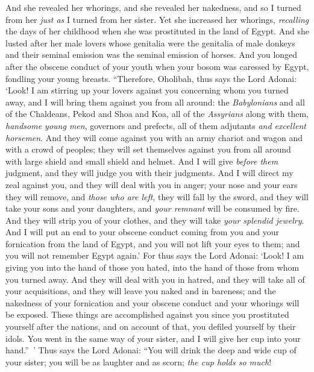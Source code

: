\begin{biblechapter}
\verse And she revealed her whorings, and she revealed her nakedness, and so I turned from her \textit{just as} I turned from her sister.
\verse Yet she increased her whorings, \textit{recalling} the days of her childhood when she was prostituted in the land of Egypt.
\verse And she lusted after her male lovers whose genitalia were the genitalia of male donkeys and their seminal emission was the seminal emission of horses.
\verse And you longed after the obscene conduct of your youth when your bosom was caressed by Egypt, fondling your young breasts.
\verse “Therefore, Oholibah, thus says the Lord Adonai: ‘Look! I am stirring up your lovers against you concerning whom you turned away, and I will bring them against you from all around:
\verse the \textit{Babylonians} and all of the Chaldeans, Pekod and Shoa and Koa, all of the \textit{Assyrians} along with them, \textit{handsome young men}, governors and prefects, all of them adjutants \textit{and excellent horsemen}.
\verse And they will come against you with an army chariot and wagon and with a crowd of peoples; they will set themselves against you from all around with large shield and small shield and helmet. And I will give \textit{before them} judgment, and they will judge you with their judgments.
\verse And I will direct my zeal against you, and they will deal with you in anger; your nose and your ears they will remove, and \textit{those who are left}, they will fall by the sword, and they will take your sons and your daughters, and \textit{your remnant} will be consumed by fire.
\verse And they will strip you of your clothes, and they will take \textit{your splendid jewelry}.
\verse And I will put an end to your obscene conduct coming from you and your fornication from the land of Egypt, and you will not lift your eyes to them; and you will not remember Egypt again.’
\verse For thus says the Lord Adonai: ‘Look! I am giving you into the hand of those you hated, into the hand of those from whom you turned away.
\verse And they will deal with you in hatred, and they will take all of your acquisitions, and they will leave you naked and in bareness; and the nakedness of your fornication and your obscene conduct and your whorings will be exposed.
\verse These things are accomplished against you since you prostituted yourself after the nations, and on account of that, you defiled yourself by their idols.
\verse You went in the same way of your sister, and I will give her cup into your hand.” ’
\verse Thus says the Lord Adonai: “You will drink the deep and wide cup of your sister; you will be as laughter and as scorn; \textit{the cup holds so much}!

\end{biblechapter}

